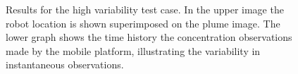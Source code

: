 \documentclass[ letterpaper, 10 pt, conference]{ieeeconf}  %
\begin{document}
\begin{figure}[thpb]
      \centering
      \caption{Results for the high variability test case.  In the upper image the robot location is shown superimposed on the plume image.  The lower graph shows the time history the concentration observations made by the mobile platform, illustrating the variability in instantaneous observations.}
   \label{f:case2}
 \end{figure}
\end{document}
